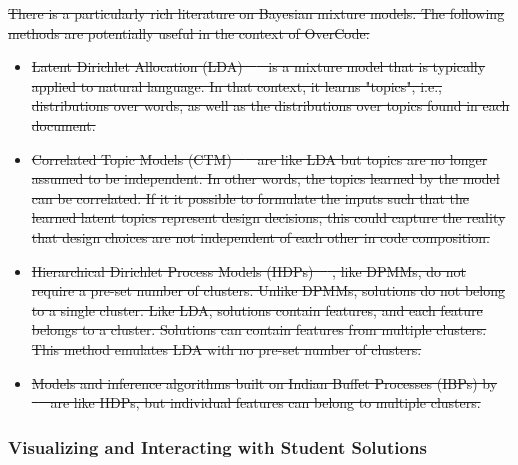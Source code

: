 \documentclass[12pt,twoside]{mitthesis}
\providecommand{\DIFdeltex}[1]{{\protect\color{red}\sout{#1}}}                      %
\providecommand{\DIFaddbegin}{} %
\providecommand{\DIFaddend}{} %
\providecommand{\DIFdelbegin}{} %
\providecommand{\DIFdelend}{} %
\providecommand{\DIFdel}[1]{\texorpdfstring{\DIFdeltex{#1}}{}} %
\begin{document}
\DIFdelbegin \DIFdel{There is a particularly rich literature on Bayesian mixture models. The following methods are potentially useful in the context of OverCode: 
}%
 \begin{itemize} %
\item%
\DIFdel{Latent Dirichlet Allocation (LDA)~\mbox{%
\cite{bleiLDA} }%
is a mixture model that is typically applied to natural language. In that context, it learns "topics", i.e., distributions over words, as well as the distributions over topics found in each document. %
}%
\item%
\DIFdel{Correlated Topic Models (CTM)~\mbox{%
\cite{} }%
are like LDA but topics are no longer assumed to be independent. In other words, the topics learned by the model can be correlated. If it it possible to formulate the inputs such that the learned latent topics represent design decisions, this could capture the reality that design choices are not independent of each other in code composition.
}%
\item%
\DIFdel{Hierarchical Dirichlet Process Models (HDPs)~\mbox{%
\cite{}}%
, like DPMMs, do not require a pre-set number of clusters. Unlike DPMMs, solutions do not belong to a single cluster. Like LDA, solutions contain features, and each feature belongs to a cluster. Solutions can contain features from multiple clusters. This method emulates LDA with no pre-set number of clusters. 
}%
\item%
\DIFdel{Models and inference algorithms built on Indian Buffet Processes (IBPs) by \mbox{%
\citet{doshi2009indian} }%
are like HDPs, but individual features can belong to multiple clusters.
}
 \end{itemize} %
\DIFdelend \DIFaddbegin \subsubsection{Visualizing and Interacting with Student Solutions}
\DIFaddend 
\end{document}
